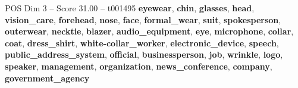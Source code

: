 \begin{textsample}{POS Dim 3 – Score 31.00 – t001495}  \label{ex:f3_pos_019}
\textbf{eyewear}, \textbf{chin}, \textbf{glasses}, \textbf{head}, \textbf{vision\_care}, \textbf{forehead}, \textbf{nose}, \textbf{face}, \textbf{formal\_wear}, \textbf{suit}, \textbf{spokesperson}, \textbf{outerwear}, \textbf{necktie}, \textbf{blazer}, \textbf{audio\_equipment}, \textbf{eye}, \textbf{microphone}, \textbf{collar}, \textbf{coat}, \textbf{dress\_shirt}, \textbf{white-collar\_worker}, \textbf{electronic\_device}, \textbf{speech}, \textbf{public\_address\_system}, \textbf{official}, \textbf{businessperson}, \textbf{job}, \textbf{wrinkle}, \textbf{logo}, \textbf{speaker}, \textbf{management}, \textbf{organization}, \textbf{news\_conference}, \textbf{company}, \textbf{government\_agency}

\end{textsample}

